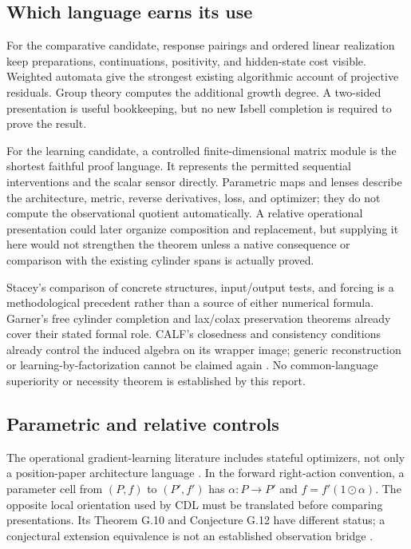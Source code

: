 \documentclass[11pt]{article}
\theoremstyle{remark}
\begin{document}
\subsection{Which language earns its use}

For the comparative candidate, response pairings and ordered linear realization keep preparations, continuations, positivity, and hidden-state cost visible. Weighted automata give the strongest existing algorithmic account of projective residuals. Group theory computes the additional growth degree. A two-sided presentation is useful bookkeeping, but no new Isbell completion is required to prove the result.

For the learning candidate, a controlled finite-dimensional matrix module is the shortest faithful proof language. It represents the permitted sequential interventions and the scalar sensor directly. Parametric maps and lenses describe the architecture, metric, reverse derivatives, loss, and optimizer; they do not compute the observational quotient automatically. A relative operational presentation could later organize composition and replacement, but supplying it here would not strengthen the theorem unless a native consequence or comparison with the existing cylinder spans is actually proved.

Stacey's comparison of concrete structures, input/output tests, and forcing is a methodological precedent rather than a source of either numerical formula. Garner's free cylinder completion and lax/colax preservation theorems already cover their stated formal role. CALF's closedness and consistency conditions already control the induced algebra on its wrapper image; generic reconstruction or learning-by-factorization cannot be claimed again \cite{Stacey,Garner,CALF}. No common-language superiority or necessity theorem is established by this report.

\subsection{Parametric and relative controls}
\label{sec:relative}

The operational gradient-learning literature includes stateful optimizers, not only a position-paper architecture language \cite{GradientLearning,Lenses}. In the forward right-action convention, a parameter cell from $(P,f)$ to $(P',f')$ has $\alpha:P\to P'$ and $f=f'(1\odot\alpha)$. The opposite local orientation used by CDL must be translated before comparing presentations. Its Theorem G.10 and Conjecture G.12 have different status; a conjectural extension equivalence is not an established observation bridge \cite{CDL,Contract}.
\end{document}
